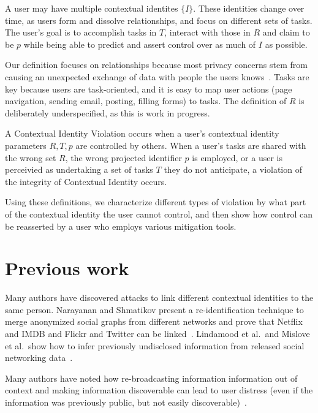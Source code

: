 \documentclass{llncs}
\begin{document}
A user may have multiple contextual identites $\{I\}$. These identities change
over time, as users form and dissolve relationships, and focus on different
sets of tasks. The user's goal is to accomplish tasks in $T$,
interact with those in $R$ and claim to be $p$  while being able to predict and
assert control over as much of $I$ as possible.

Our definition focuses on relationships because most privacy concerns stem
from causing an unexpected exchange of data with people the users
knows~\cite{wang}. Tasks are key because users are task-oriented, and it is
easy to map user actions (page navigation, sending email, posting, filling
forms) to tasks.  The definition of $R$ is deliberately underspecified, as this
is work in progress.

\begin{definition}
  A Contextual Identity Violation occurs when a user's contextual identity
parameters $R,T,p$ are controlled by others.  When a user's tasks are shared
with the wrong set $R$, the wrong projected identifier $p$ is employed, or a
user is perceivied as undertaking a set of tasks $T$ they do not anticipate, a
violation of the integrity of Contextual Identity occurs.

\end{definition}

Using these definitions, we characterize different types of violation by what part of the contextual identity the user cannot control, and then show how control can be reasserted by a user who employs various mitigation tools.

\section{Previous work}

Many authors have discovered attacks to link different contextual identities to
the same person. Narayanan and Shmatikov present a re-identification technique
to merge anonymized social graphs from different networks and prove that
Netflix and IMDB and Flickr and Twitter can be
linked~\cite{narayanan1,narayanan2}. Lindamood et al.~and Mislove et al.~show
how to infer previously undisclosed information from released social networking
data~\cite{lindamood,mislove}.

Many authors have noted how re-broadcasting information information out of
context and making information discoverable can lead to user distress (even if
the information was previously public, but not easily
discoverable)~\cite{boyd1,chew,nissenbaum}.
\end{document}
